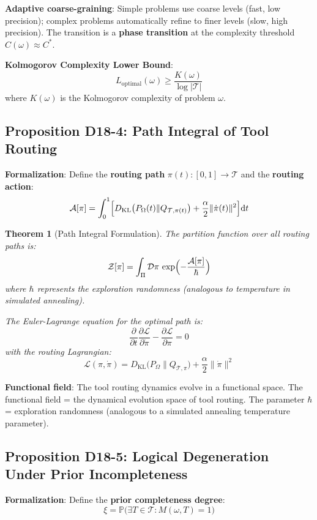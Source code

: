 \documentclass[12pt, a4paper]{article}
\newtheorem{theorem}{Theorem}[section]
\newcommand{\diff}{\mathrm{d}}
\newcommand{\KL}{D_{\mathrm{KL}}}
\newcommand{\hbarF}{\hbar}
\begin{document}
\textbf{Adaptive coarse-graining}: Simple problems use coarse levels (fast, low precision); complex problems automatically refine to finer levels (slow, high precision). The transition is a \textbf{phase transition} at the complexity threshold $C(\omega) \approx C^*$.

\textbf{Kolmogorov Complexity Lower Bound}:
$$L_{\text{optimal}}(\omega) \geq \frac{K(\omega)}{\log |\mathcal{T}|}$$
where $K(\omega)$ is the Kolmogorov complexity of problem $\omega$.

\subsection{Proposition D18-4: Path Integral of Tool Routing}

\textbf{Formalization}: Define the \textbf{routing path} $\pi(t): [0,1] \to \mathcal{T}$ and the \textbf{routing action}:
$$\mathcal{A}[\pi] = \int_0^1 \Bigl[ \KL\bigl(P_{\Omega}(t) \| Q_{\mathcal{T},\pi(t)}\bigr) + \frac{\alpha}{2} \|\dot{\pi}(t)\|^2 \Bigr] \diff t$$

\begin{theorem}[Path Integral Formulation]\label{thm:d18-4}
The partition function over all routing paths is:
$$\mathcal{Z}[\pi] = \int_{\Pi} \mathcal{D}\pi \, \exp\Bigl(-\frac{\mathcal{A}[\pi]}{\hbarF}\Bigr)$$
where $\hbarF$ represents the exploration randomness (analogous to temperature in simulated annealing).

The Euler-Lagrange equation for the optimal path is:
$$\frac{\partial}{\partial t} \frac{\partial \mathcal{L}}{\partial \dot{\pi}} - \frac{\partial \mathcal{L}}{\partial \pi} = 0$$
with the routing Lagrangian:
$$\mathcal{L}(\pi, \dot{\pi}) = \KL\bigl(P_{\Omega} \| Q_{\mathcal{T},\pi}\bigr) + \frac{\alpha}{2} \|\dot{\pi}\|^2$$
\end{theorem}

\textbf{Functional field}: The tool routing dynamics evolve in a functional space. The functional field = the dynamical evolution space of tool routing. The parameter $\hbarF$ = exploration randomness (analogous to a simulated annealing temperature parameter).

\subsection{Proposition D18-5: Logical Degeneration Under Prior Incompleteness}

\textbf{Formalization}: Define the \textbf{prior completeness degree}:
$$\xi = \mathbb{P}\bigl(\exists T \in \mathcal{T}: M(\omega, T) = 1\bigr)$$
\end{document}
